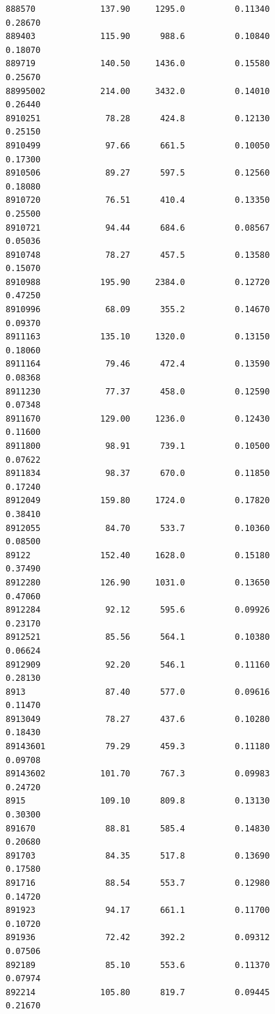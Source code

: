 \documentclass[
  letterpaper,
  DIV=11,
  numbers=noendperiod]{scrartcl}
\begin{document}
\begin{verbatim}
888570             137.90     1295.0          0.11340           0.28670
889403             115.90      988.6          0.10840           0.18070
889719             140.50     1436.0          0.15580           0.25670
88995002           214.00     3432.0          0.14010           0.26440
8910251             78.28      424.8          0.12130           0.25150
8910499             97.66      661.5          0.10050           0.17300
8910506             89.27      597.5          0.12560           0.18080
8910720             76.51      410.4          0.13350           0.25500
8910721             94.44      684.6          0.08567           0.05036
8910748             78.27      457.5          0.13580           0.15070
8910988            195.90     2384.0          0.12720           0.47250
8910996             68.09      355.2          0.14670           0.09370
8911163            135.10     1320.0          0.13150           0.18060
8911164             79.46      472.4          0.13590           0.08368
8911230             77.37      458.0          0.12590           0.07348
8911670            129.00     1236.0          0.12430           0.11600
8911800             98.91      739.1          0.10500           0.07622
8911834             98.37      670.0          0.11850           0.17240
8912049            159.80     1724.0          0.17820           0.38410
8912055             84.70      533.7          0.10360           0.08500
89122              152.40     1628.0          0.15180           0.37490
8912280            126.90     1031.0          0.13650           0.47060
8912284             92.12      595.6          0.09926           0.23170
8912521             85.56      564.1          0.10380           0.06624
8912909             92.20      546.1          0.11160           0.28130
8913                87.40      577.0          0.09616           0.11470
8913049             78.27      437.6          0.10280           0.18430
89143601            79.29      459.3          0.11180           0.09708
89143602           101.70      767.3          0.09983           0.24720
8915               109.10      809.8          0.13130           0.30300
891670              88.81      585.4          0.14830           0.20680
891703              84.35      517.8          0.13690           0.17580
891716              88.54      553.7          0.12980           0.14720
891923              94.17      661.1          0.11700           0.10720
891936              72.42      392.2          0.09312           0.07506
892189              85.10      553.6          0.11370           0.07974
892214             105.80      819.7          0.09445           0.21670

\end{verbatim}
\end{document}
